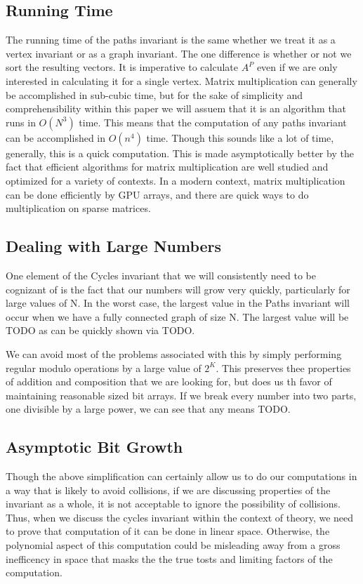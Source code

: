 \documentclass[11pt,a4paper]{report}
\begin{document}
\subsection{Running Time}
The running time of the paths invariant is the same whether we treat it as a vertex invariant or as a graph invariant.
The one difference is whether or not we sort the resulting vectors.
It is imperative to calculate $A^P$ even if we are only interested in calculating it for a single vertex.
Matrix multiplication can generally be accomplished in sub-cubic time, but for the sake of simplicity and comprehensibility within this paper we will assuem that it is an algorithm that runs in $O(N^3)$  time.
This means that the computation of any paths invariant can be accomplished in $O(n^4)$ time.
Though this sounds like a lot of time, generally, this is a quick computation.
This is made asymptotically better by the fact that efficient algorithms for matrix multiplication are well studied and optimized for a variety of contexts.
In a modern context, matrix multiplication can be done efficiently by GPU arrays, and there are quick ways to do multiplication on sparse matrices.

\subsection{Dealing with Large Numbers}
One element of the Cycles invariant that we will consistently need to be cognizant of is the fact that our numbers will grow very quickly, particularly for large values of N.
In the worst case, the largest value in the Paths invariant will occur when we have a fully connected graph of size N.
The largest value will be TODO as can be quickly shown via TODO.

We can avoid most of the problems associated with this by simply performing regular modulo operations by a large value of $2^K$.
This preserves thee properties of addition and composition that we are looking for, but does us th favor of maintaining reasonable sized bit arrays.
If we break every number into two parts, one divisible by a large power, we can see that any means TODO.

\subsection{Asymptotic Bit Growth}
Though the above simplification can certainly allow us to do our computations in a way that is likely to avoid collisions, if we are discussing properties of the invariant as a whole, it is not acceptable to ignore the possibility of collisions.
Thus, when we discuss the cycles invariant within the context of theory, we need to prove that computation of it can be done in linear space.
Otherwise, the polynomial aspect of this computation could be misleading away from a gross inefficency in space that masks the the true tosts and limiting factors of the computation.
\end{document}
